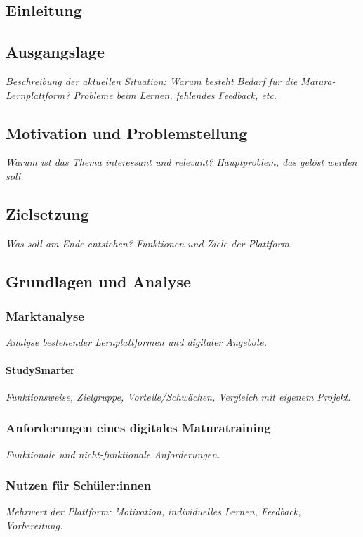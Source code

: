 \documentclass[12pt,a4paper,titlepage,listof=totoc,bibliography=totoc,chapteratlists=0pt]{scrreprt}
\begin{document}
\begin{spacing}{1}

\chapter{Einleitung}

\section{Ausgangslage}
\textit{Beschreibung der aktuellen Situation: Warum besteht Bedarf für die Matura-Lernplattform? Probleme beim Lernen, fehlendes Feedback, etc.}

\section{Motivation und Problemstellung}
\textit{Warum ist das Thema interessant und relevant? Hauptproblem, das gelöst werden soll.}

\section{Zielsetzung}
\textit{Was soll am Ende entstehen? Funktionen und Ziele der Plattform.}

\section{Grundlagen und Analyse}

\subsection{Marktanalyse}
\textit{Analyse bestehender Lernplattformen und digitaler Angebote.}

\subsubsection{StudySmarter}
\textit{Funktionsweise, Zielgruppe, Vorteile/Schwächen, Vergleich mit eigenem Projekt.}

\subsection{Anforderungen eines digitales Maturatraining}
\textit{Funktionale und nicht-funktionale Anforderungen.}

\subsection{Nutzen für Schüler:innen}
\textit{Mehrwert der Plattform: Motivation, individuelles Lernen, Feedback, Vorbereitung.}


\end{spacing}
\end{document}
